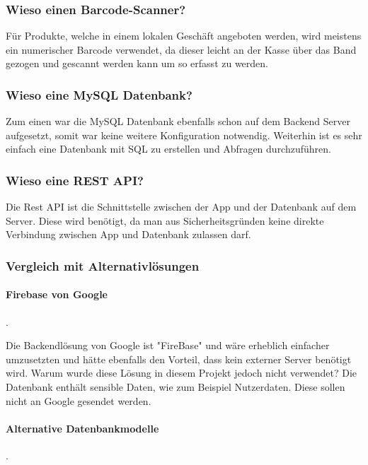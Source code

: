 \documentclass{scrartcl}
\begin{document}
\subsubsection{Wieso einen Barcode-Scanner?}

Für Produkte, welche in einem lokalen Geschäft angeboten werden, wird meistens ein numerischer Barcode verwendet, da dieser leicht an der Kasse über das Band gezogen und gescannt werden kann um so erfasst zu werden.

\subsubsection{Wieso eine MySQL Datenbank?}

Zum einen war die MySQL Datenbank ebenfalls schon auf dem Backend Server aufgesetzt, somit war keine weitere Konfiguration notwendig. Weiterhin ist es sehr einfach eine Datenbank mit SQL zu erstellen und Abfragen durchzuführen.

\subsubsection{Wieso eine REST API?}

Die Rest API ist die Schnittstelle zwischen der App und der Datenbank auf dem Server. Diese wird benötigt, da man aus Sicherheitsgründen keine direkte Verbindung zwischen App und Datenbank zulassen darf.

\subsubsection{Vergleich mit Alternativlösungen}

\paragraph{Firebase von Google}.\newline

\noindent Die Backendlösung von Google ist "FireBase" und wäre erheblich einfacher umzusetzten und hätte ebenfalls den Vorteil, dass kein externer Server benötigt wird. Warum wurde diese Lösung in diesem Projekt jedoch nicht verwendet? Die Datenbank enthält sensible Daten, wie zum Beispiel Nutzerdaten. Diese sollen nicht an Google gesendet werden.

\paragraph{Alternative Datenbankmodelle}.\newline
\end{document}
